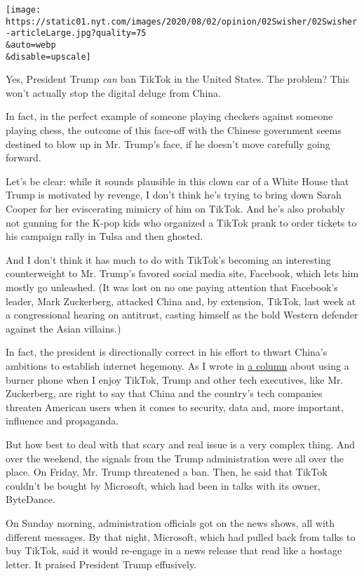 \texttt{[image: https://static01.nyt.com/images/2020/08/02/opinion/02Swisher/02Swisher-articleLarge.jpg?quality=75\\\&auto=webp\\\&disable=upscale]}

Yes, President Trump \emph{can} ban TikTok in the United States. The
problem? This won't actually stop the digital deluge from China.

In fact, in the perfect example of someone playing checkers against
someone playing chess, the outcome of this face-off with the Chinese
government seems destined to blow up in Mr. Trump's face, if he doesn't
move carefully going forward.

Let's be clear: while it sounds plausible in this clown car of a White
House that Trump is motivated by revenge, I don't think he's trying to
bring down Sarah Cooper for her eviscerating mimicry of him on TikTok.
And he's also probably not gunning for the K-pop kids who organized a
TikTok prank to order tickets to his campaign rally in Tulsa and then
ghosted.

And I don't think it has much to do with TikTok's becoming an
interesting counterweight to Mr. Trump's favored social media site,
Facebook, which lets him mostly go unleashed. (It was lost on no one
paying attention that Facebook's leader, Mark Zuckerberg, attacked China
and, by extension, TikTok, last week at a congressional hearing on
antitrust, casting himself as the bold Western defender against the
Asian villains.)

In fact, the president is directionally correct in his effort to thwart
China's ambitions to establish internet hegemony. As I wrote in
\href{https://www.nytimes.com/2020/07/17/opinion/tiktok-ban-china.html}{a
column} about using a burner phone when I enjoy TikTok, Trump and other
tech executives, like Mr. Zuckerberg, are right to say that China and
the country's tech companies threaten American users when it comes to
security, data and, more important, influence and propaganda.

But how best to deal with that scary and real issue is a very complex
thing. And over the weekend, the signals from the Trump administration
were all over the place. On Friday, Mr. Trump threatened a ban. Then, he
said that TikTok couldn't be bought by Microsoft, which had been in
talks with its owner, ByteDance.

On Sunday morning, administration officials got on the news shows, all
with different messages. By that night, Microsoft, which had pulled back
from talks to buy TikTok, said it would re-engage in a news release that
read like a hostage letter. It praised President Trump effusively.

